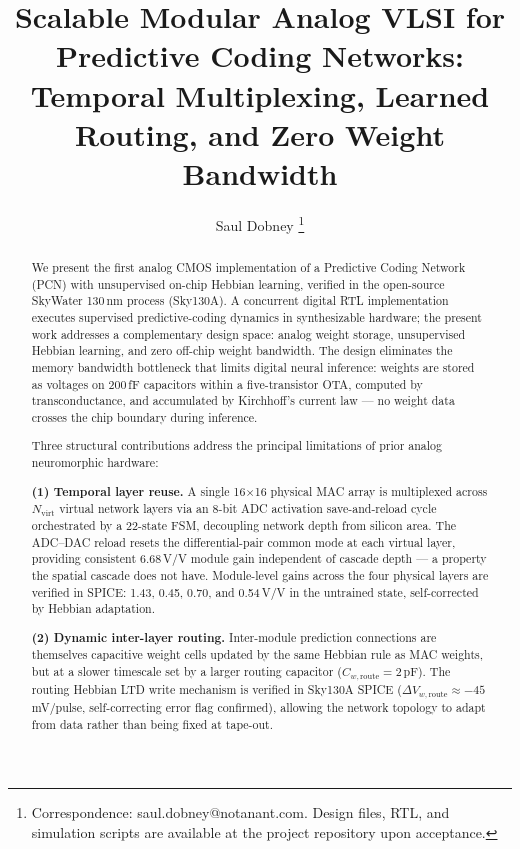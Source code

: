 \documentclass[journal,10pt,twoside]{IEEEtran}
\begin{document}
\title{Scalable Modular Analog VLSI for Predictive Coding Networks:\\
       Temporal Multiplexing, Learned Routing, and Zero Weight Bandwidth}

\author{Saul Dobney%
  \thanks{Correspondence: saul.dobney@notanant.com.
  Design files, RTL, and simulation scripts are available
  at the project repository upon acceptance.}%
}

\maketitle

\begin{abstract}
We present the first analog CMOS implementation of a Predictive Coding
Network (PCN) with unsupervised on-chip Hebbian learning, verified in the
open-source SkyWater 130\,nm process (Sky130A).
A concurrent digital RTL implementation~\cite{oh2026synthesizable} executes
supervised predictive-coding dynamics in synthesizable hardware; the present
work addresses a complementary design space: analog weight storage,
unsupervised Hebbian learning, and zero off-chip weight bandwidth.
The design eliminates the memory bandwidth bottleneck that limits digital
neural inference: weights are stored as voltages on 200\,fF capacitors
within a five-transistor OTA, computed by transconductance, and accumulated
by Kirchhoff's current law — no weight data crosses the chip boundary
during inference.

Three structural contributions address the principal limitations of prior
analog neuromorphic hardware:

\textbf{(1) Temporal layer reuse.}
A single 16$\times$16 physical MAC array is multiplexed across $N_\text{virt}$
virtual network layers via an 8-bit ADC activation save-and-reload cycle
orchestrated by a 22-state FSM, decoupling network depth from silicon area.
The ADC--DAC reload resets the differential-pair common mode at each virtual
layer, providing consistent 6.68\,V/V module gain independent of cascade
depth — a property the spatial cascade does not have.
Module-level gains across the four physical layers are verified in SPICE:
1.43, 0.45, 0.70, and 0.54\,V/V in the untrained state,
self-corrected by Hebbian adaptation.

\textbf{(2) Dynamic inter-layer routing.}
Inter-module prediction connections are themselves capacitive weight cells
updated by the same Hebbian rule as MAC weights, but at a slower timescale
set by a larger routing capacitor ($C_{w,\text{route}} = 2$\,pF).
The routing Hebbian LTD write mechanism is verified in Sky130A SPICE
($\Delta V_{w,\text{route}} \approx -45$\,mV/pulse, self-correcting error
flag confirmed), allowing the network topology to adapt from data rather
than being fixed at tape-out.


\end{abstract}
\end{document}
